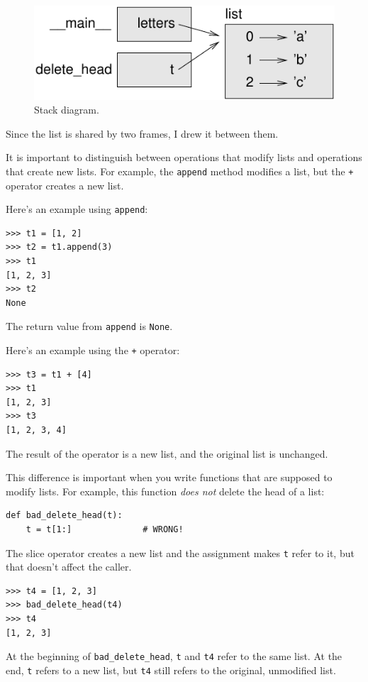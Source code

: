 \documentclass[10pt]{book}
\begin{document}
\begin{figure}
\centerline
{\includegraphics[scale=0.8]{figs/stack5.pdf}}
\caption{Stack diagram.}
\label{fig.stack5}
\end{figure}

Since the list is shared by two frames, I drew
it between them.

It is important to distinguish between operations that
modify lists and operations that create new lists.  For
example, the {\tt append} method modifies a list, but the
{\tt +} operator creates a new list.

Here's an example using {\tt append}:
%
\begin{verbatim}
>>> t1 = [1, 2]
>>> t2 = t1.append(3)
>>> t1
[1, 2, 3]
>>> t2
None
\end{verbatim}
%
The return value from {\tt append} is {\tt None}.

Here's an example using the {\tt +} operator:
%
\begin{verbatim}
>>> t3 = t1 + [4]
>>> t1
[1, 2, 3]
>>> t3
[1, 2, 3, 4]
\end{verbatim}
%
The result of the operator is a new list, and the original list is
unchanged.

This difference is important when you write functions that
are supposed to modify lists.  For example, this function
{\em does not} delete the head of a list:
%
\begin{verbatim}
def bad_delete_head(t):
    t = t[1:]              # WRONG!
\end{verbatim}
%
The slice operator creates a new list and the assignment
makes {\tt t} refer to it, but that doesn't affect the caller.
%
\begin{verbatim}
>>> t4 = [1, 2, 3]
>>> bad_delete_head(t4)
>>> t4
[1, 2, 3]
\end{verbatim}
%
At the beginning of \verb"bad_delete_head", {\tt t} and {\tt t4}
refer to the same list.  At the end, {\tt t} refers to a new list,
but {\tt t4} still refers to the original, unmodified list.
\end{document}
